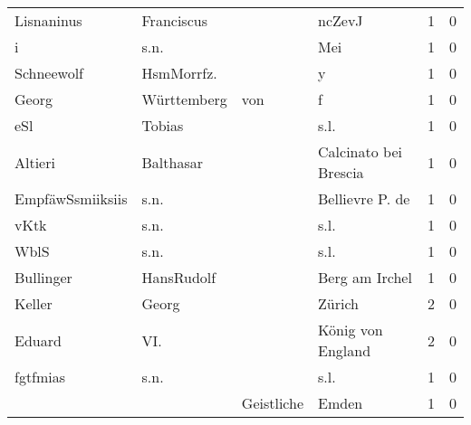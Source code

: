 \begin{tabular}{llllrr}
               Lisnaninus &                         Franciscus &             &                                      ncZevJ &          1 &         0 \\
                        i &                               s.n. &             &                                         Mei &          1 &         0 \\
               Schneewolf &                         HsmMorrfz. &             &                                           y &          1 &         0 \\
                    Georg &                        Württemberg &         von &                                           f &          1 &         0 \\
                      eSl &                             Tobias &             &                                        s.l. &          1 &         0 \\
                  Altieri &                          Balthasar &             &                       Calcinato bei Brescia &          1 &         0 \\
         EmpfäwSsmiiksiis &                               s.n. &             &                             Bellievre P. de &          1 &         0 \\
                     vKtk &                               s.n. &             &                                        s.l. &          1 &         0 \\
                     WblS &                               s.n. &             &                                        s.l. &          1 &         0 \\
                Bullinger &                         HansRudolf &             &                              Berg am Irchel &          1 &         0 \\
                   Keller &                              Georg &             &                                      Zürich &          2 &         0 \\
                   Eduard &                                VI. &             &                           König von England &          2 &         0 \\
                 fgtfmias &                               s.n. &             &                                        s.l. &          1 &         0 \\
                          &                                    &  Geistliche &                                       Emden &          1 &         0 \\

\end{tabular}
